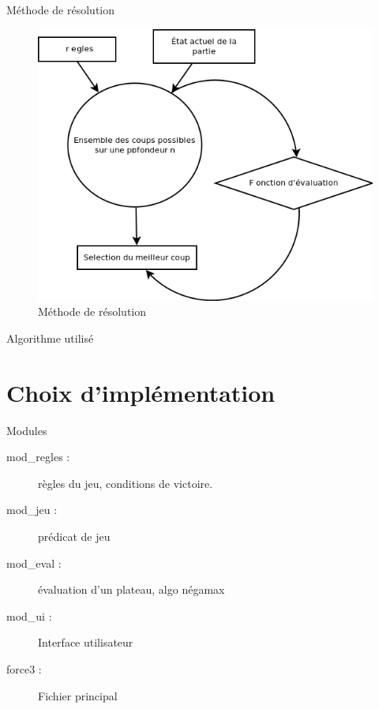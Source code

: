 \documentclass{beamer}
\begin{document}
\begin{frame}{Méthode de résolution}
  \begin{figure}
    \includegraphics[height=0.7\textheight]{./pix/methode}
    \centering
    \caption{Méthode de résolution}
  \end{figure}
\end{frame}


\begin{frame}{Algorithme utilisé}
\end{frame}

\section{Choix d’implémentation}
    \begin{frame}{Modules}
        \begin{description}
            \item[mod\_regles :] règles du jeu, conditions de victoire.
            \item[mod\_jeu :] prédicat de jeu
            \item[mod\_eval :] évaluation d'un plateau, algo négamax
            \item[mod\_ui :] Interface utilisateur
            \item[force3 :] Fichier principal
        \end{description}
    \end{frame}
\end{document}
